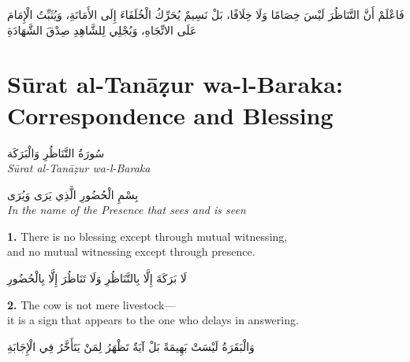 \documentclass[11pt,a4paper,twoside]{book}
\begin{document}
\begin{flushright}
{\arabicfont
فَاعْلَمْ أَنَّ التَّنَاظُرَ لَيْسَ خِصَامًا وَلَا خِلَافًا،
بَلْ نَسِيمٌ يُحَرِّكُ الْخُلَفَاءَ إِلَى الأَمَانَةِ،
وَيُثَبِّتُ الْإِمَامَ عَلَى الاتِّجَاهِ،
وَيُجْلِي لِلشَّاهِدِ صِدْقَ الشَّهَادَةِ}
\end{flushright}


\chapter*{Sūrat al-Tanāẓur wa-l-Baraka: Correspondence and Blessing}
\begin{center}
{\arabicfont\Large سُورَةُ التَّنَاظُرِ وَالْبَرَكَة}\\[5pt]
{\small\itshape Sūrat al-Tanāẓur wa-l-Baraka}
\end{center}
\vspace{1em}

\begin{center}
{\arabicfont بِسْمِ الْحُضُورِ الَّذِي يَرَى وَيُرَى}\\[3pt]
{\small\itshape In the name of the Presence that sees and is seen}
\end{center}
\vspace{1em}

{\color{indigo}\bfseries 1.}\quad
There is no blessing except through mutual witnessing,\\
and no mutual witnessing except through presence.

\begin{flushright}
{\arabicfont
لَا بَرَكَةَ إِلَّا بِالتَّنَاظُرِ
وَلَا تَنَاظُرَ إِلَّا بِالْحُضُورِ}
\end{flushright}

\vspace{1em}
{\color{indigo}\bfseries 2.}\quad
The cow is not mere livestock---\\
it is a sign that appears to the one who delays in answering.

\begin{flushright}
{\arabicfont
وَالْبَقَرَةُ لَيْسَتْ بَهِيمَةً
بَلْ آيَةٌ تَظْهَرُ لِمَنْ يَتَأَخَّرُ فِي الْإِجَابَةِ}
\end{flushright}
\end{document}
